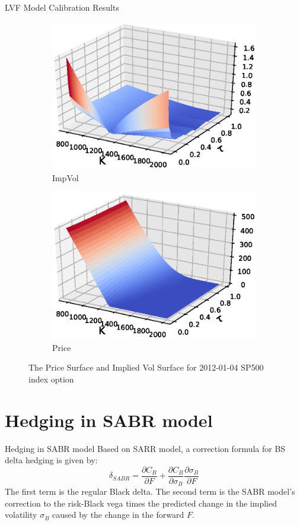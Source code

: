 \documentclass[10pt,table,mathserif]{beamer}
\begin{document}
\begin{frame}{LVF Model Calibration Results}
\begin{figure}
	\begin{subfigure}[b]{0.49\textwidth}
		\includegraphics[width=\textwidth]{ImpVol}
		\caption{ImpVol}
	\end{subfigure}
	\begin{subfigure}[b]{0.49\textwidth}
		\includegraphics[width=\textwidth]{Price}
		\caption{Price}
	\end{subfigure}
	\caption{The Price Surface and Implied Vol Surface for 2012-01-04 SP500 index option}
\end{figure}
\end{frame}

\section{Hedging in SABR model}
\begin{frame}{Hedging in SABR model}
Based on SARR model, a correction formula for BS delta hedging is given by:
\[
\delta_{SABR}=\frac{\partial C_{B}}{\partial F} + \frac{\partial C_{B}}{\partial \sigma_B}
\frac{\partial \sigma_B}{\partial F}
\]
The first term is the regular Black delta.
The second term is the SABR model's correction to the risk-Black vega times the predicted change in the implied volatility $\sigma_B$ caused by the change in the forward $F$.
\end{frame}
\end{document}
